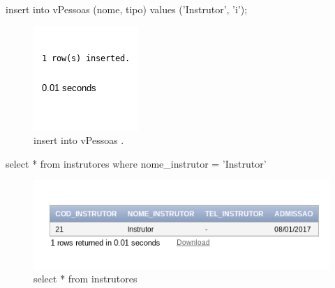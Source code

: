 \documentclass[
article,			%
11pt,				%
oneside,			%
a4paper,			%
english,			%
brazil,				%
sumario=tradicional
]{abntex2}
\begin{document}
\begin{enumerate}
					
			insert into vPessoas (nome, tipo) values ('Instrutor', 'i');

					\begin{center}
					\begin{figure}[H]
						\centering
						\includegraphics[scale=0.5]{./imagens/23.png}
						\caption{insert into vPessoas  .}
						\label{rota-1}
					\end{figure}
				\end{center}
	
			
			select * from instrutores where nome\_instrutor = 'Instrutor'
			
				 \begin{center}
					\begin{figure}[H]
						\centering
						\includegraphics[scale=0.5]{./imagens/25.png}
						\caption{	select * from instrutores}
						\label{rota-1}
					\end{figure}
				\end{center}
			

\end{enumerate}
\end{document}
